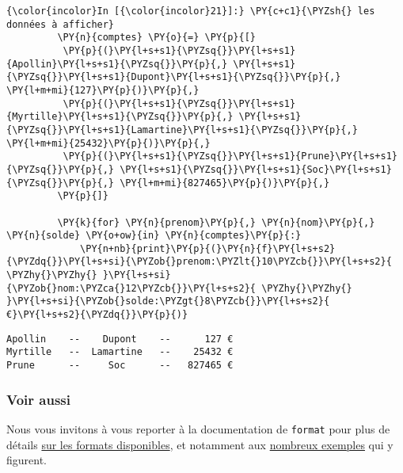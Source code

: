     \begin{Verbatim}[commandchars=\\\{\}]
{\color{incolor}In [{\color{incolor}21}]:} \PY{c+c1}{\PYZsh{} les données à afficher}
         \PY{n}{comptes} \PY{o}{=} \PY{p}{[}
          \PY{p}{(}\PY{l+s+s1}{\PYZsq{}}\PY{l+s+s1}{Apollin}\PY{l+s+s1}{\PYZsq{}}\PY{p}{,} \PY{l+s+s1}{\PYZsq{}}\PY{l+s+s1}{Dupont}\PY{l+s+s1}{\PYZsq{}}\PY{p}{,} \PY{l+m+mi}{127}\PY{p}{)}\PY{p}{,}
          \PY{p}{(}\PY{l+s+s1}{\PYZsq{}}\PY{l+s+s1}{Myrtille}\PY{l+s+s1}{\PYZsq{}}\PY{p}{,} \PY{l+s+s1}{\PYZsq{}}\PY{l+s+s1}{Lamartine}\PY{l+s+s1}{\PYZsq{}}\PY{p}{,} \PY{l+m+mi}{25432}\PY{p}{)}\PY{p}{,}
          \PY{p}{(}\PY{l+s+s1}{\PYZsq{}}\PY{l+s+s1}{Prune}\PY{l+s+s1}{\PYZsq{}}\PY{p}{,} \PY{l+s+s1}{\PYZsq{}}\PY{l+s+s1}{Soc}\PY{l+s+s1}{\PYZsq{}}\PY{p}{,} \PY{l+m+mi}{827465}\PY{p}{)}\PY{p}{,}
         \PY{p}{]}
         
         \PY{k}{for} \PY{n}{prenom}\PY{p}{,} \PY{n}{nom}\PY{p}{,} \PY{n}{solde} \PY{o+ow}{in} \PY{n}{comptes}\PY{p}{:}
             \PY{n+nb}{print}\PY{p}{(}\PY{n}{f}\PY{l+s+s2}{\PYZdq{}}\PY{l+s+si}{\PYZob{}prenom:\PYZlt{}10\PYZcb{}}\PY{l+s+s2}{ \PYZhy{}\PYZhy{} }\PY{l+s+si}{\PYZob{}nom:\PYZca{}12\PYZcb{}}\PY{l+s+s2}{ \PYZhy{}\PYZhy{} }\PY{l+s+si}{\PYZob{}solde:\PYZgt{}8\PYZcb{}}\PY{l+s+s2}{ €}\PY{l+s+s2}{\PYZdq{}}\PY{p}{)}
\end{Verbatim}


    \begin{Verbatim}[commandchars=\\\{\}]
Apollin    --    Dupont    --      127 €
Myrtille   --  Lamartine   --    25432 €
Prune      --     Soc      --   827465 €

    \end{Verbatim}

    \hypertarget{voir-aussi}{%
\subsubsection{Voir aussi}\label{voir-aussi}}

    Nous vous invitons à vous reporter à la documentation de \texttt{format}
pour plus de détails
\href{https://docs.python.org/3/library/string.html\#formatstrings}{sur
les formats disponibles}, et notamment aux
\href{https://docs.python.org/3/library/string.html\#format-examples}{nombreux
exemples} qui y figurent.


    
    
    
